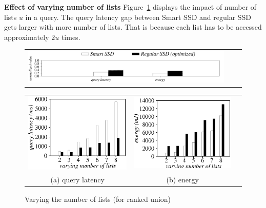 \textbf{Effect of varying number of lists}
Figure~\ref{fig:varyNumKeywordsRankUnion} displays the impact of number of lists $u$ in a query. The query latency gap between Smart SSD and regular SSD gets larger with more number of lists. That is because each list has to be accessed approximately $2u$ times.
  \begin{figure}[tbp]
  \centering
    \begin{tabular}{ccc}
 \includegraphics[width=0.52\columnwidth]{figures/banner2.pdf}
\end{tabular}
\vspace{-0.1cm}
\renewcommand{\tabcolsep}{0.1mm}
  \begin{tabular}{ccc}
 \includegraphics[width=0.5\columnwidth]{figures/RankUnion-time-VaryNumLists.eps}&
  \includegraphics[width=0.5\columnwidth]{figures/RankUnion-energy-VaryNumLists.eps}\\
  (a) query latency & (b) energy
\end{tabular}
  \caption{Varying the number of lists (for ranked union)}
  \label{fig:varyNumKeywordsRankUnion}
 \end{figure}


